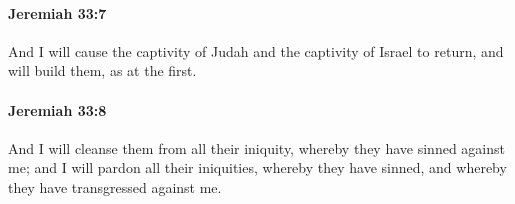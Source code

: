 		\paragraph{Jeremiah 33:7} %
			\label{JEREMIAH-33-7}

			And I will cause the captivity of Judah and the captivity of Israel to return, and will build them, as at the first.


		\paragraph{Jeremiah 33:8} %
			\label{JEREMIAH-33-8}

			And I will cleanse them from all their iniquity, whereby they have sinned against me; and I will pardon all their iniquities, whereby they have sinned, and whereby they have transgressed against me.


